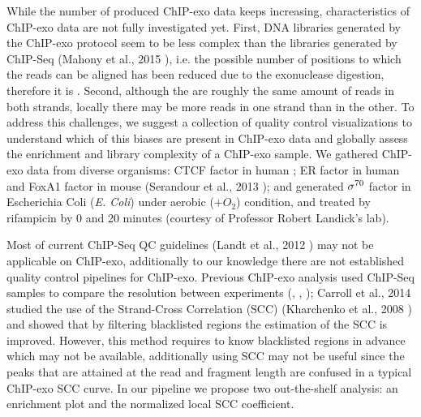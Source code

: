 \documentclass[11pt]{article}\usepackage[]{graphicx}\usepackage[]{color}
\begin{document}
While the number of produced ChIP-exo data keeps increasing,
characteristics of ChIP-exo data are not fully investigated
yet. First, DNA libraries generated by the ChIP-exo protocol seem to
be less complex than the libraries generated by ChIP-Seq (Mahony et
al., 2015 \cite{exo_review}), i.e. the possible number of positions to
which the reads can be aligned has been reduced due to the exonuclease
digestion, therefore it is . Second, although the are roughly the same amount of reads
in both strands, locally there may be more reads in one strand than in
the other. To address this challenges, we suggest a collection of
quality control visualizations to understand which of this biases are
present in ChIP-exo data and globally assess the enrichment and
library complexity of a ChIP-exo sample. We gathered ChIP-exo data from
diverse organisms: CTCF factor in human \cite{exo1}; ER factor in
human and FoxA1 factor in mouse (Serandour et al., 2013
\cite{exoillumina}); and generated $\sigma^{70}$ factor in Escherichia Coli
(\emph{E. Coli}) under aerobic ($ + O_2$) condition, and treated by
rifampicin by 0 and 20 minutes (courtesy of Professor Robert Landick's
lab).

Most of current ChIP-Seq QC guidelines (Landt et al., 2012
\cite{encode_qc}) may not be applicable on ChIP-exo, additionally to
our knowledge there are not established quality control pipelines for
ChIP-exo. Previous ChIP-exo analysis used ChIP-Seq samples to compare
the resolution between experiments (\cite{exo1}, \cite{exo2},
\cite{exoillumina}); Carroll et al., 2014 \cite{carroll.qc} studied
the use of the Strand-Cross Correlation (SCC) (Kharchenko et al., 2008
\cite{strandcc}) and showed that by filtering blacklisted regions the
estimation of the SCC is improved. However, this method requires to
know blacklisted regions in advance which may not be available,
additionally using SCC may not be useful since the peaks that are
attained at the read and fragment length are confused in a typical
ChIP-exo SCC curve.  In our pipeline we propose two out-the-shelf
analysis: an enrichment plot and the normalized local SCC coefficient.
\end{document}
